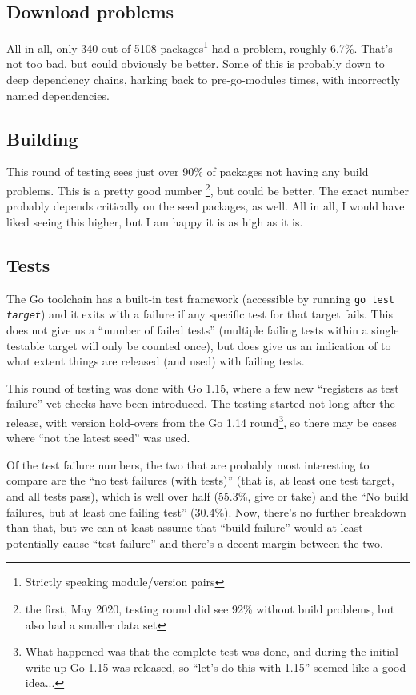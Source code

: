 \documentclass[a4paper]{paper}
\begin{document}


\subsection{Download problems}

All in all, only 340 out of 5108 packages\footnote{Strictly speaking
  module/version pairs} had a problem, roughly 6.7\%. That's not too
bad, but could obviously be better. Some of this is probably down to
deep dependency chains, harking back to pre-go-modules times, with
incorrectly named dependencies.

\subsection{Building}

This round of testing sees just over 90\% of packages not having any
build problems. This is a pretty good number \footnote{the first, May
  2020, testing round did see 92\% without build problems, but also
  had a smaller data set}, but could be better. The exact number
probably depends critically on the seed packages, as well. All in all,
I would have liked seeing this higher, but I am happy it is as high as
it is.


\subsection{Tests}

The Go toolchain has a built-in test framework (accessible by running
{\tt go test {\it target}}) and it exits with a failure if any
specific test for that target fails. This does not give us a ``number
of failed tests'' (multiple failing tests within a single testable
target will only be counted once), but does give us an indication of
to what extent things are released (and used) with failing tests.

This round of testing was done with Go 1.15, where a few new
``registers as test failure'' vet checks have been introduced. The
testing started not long after the release, with version hold-overs
from the Go 1.14 round\footnote{What happened was that the complete test was
  done, and during the initial write-up Go 1.15 was released, so
  ``let's do this with 1.15'' seemed like a good idea...}, so there
may be cases where ``not the latest seed'' was used.

Of the test failure numbers, the two that are probably most interesting
to compare are the ``no test failures (with tests)'' (that is, at
least one test target, and all tests pass), which is well over half
(55.3\%, give or take) and the ``No build failures, but at least one
failing test'' (30.4\%). Now, there's no further breakdown than that,
but we can at least assume that ``build failure'' would at least
potentially cause ``test failure'' and there's a decent margin
between the two.
\end{document}

